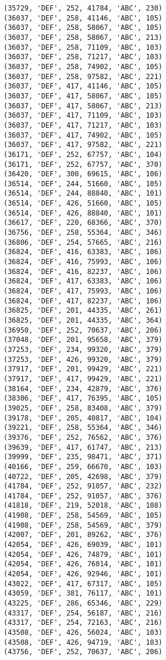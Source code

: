 \begin{verbatim}
(35729, 'DEF', 252, 41784, 'ABC', 230)
(36037, 'DEF', 258, 41146, 'ABC', 105)
(36037, 'DEF', 258, 58067, 'ABC', 105)
(36037, 'DEF', 258, 58067, 'ABC', 213)
(36037, 'DEF', 258, 71109, 'ABC', 103)
(36037, 'DEF', 258, 71217, 'ABC', 103)
(36037, 'DEF', 258, 74902, 'ABC', 105)
(36037, 'DEF', 258, 97582, 'ABC', 221)
(36037, 'DEF', 417, 41146, 'ABC', 105)
(36037, 'DEF', 417, 58067, 'ABC', 105)
(36037, 'DEF', 417, 58067, 'ABC', 213)
(36037, 'DEF', 417, 71109, 'ABC', 103)
(36037, 'DEF', 417, 71217, 'ABC', 103)
(36037, 'DEF', 417, 74902, 'ABC', 105)
(36037, 'DEF', 417, 97582, 'ABC', 221)
(36171, 'DEF', 252, 67757, 'ABC', 104)
(36171, 'DEF', 252, 67757, 'ABC', 370)
(36420, 'DEF', 300, 69615, 'ABC', 106)
(36514, 'DEF', 244, 51660, 'ABC', 105)
(36514, 'DEF', 244, 88840, 'ABC', 101)
(36514, 'DEF', 426, 51660, 'ABC', 105)
(36514, 'DEF', 426, 88840, 'ABC', 101)
(36617, 'DEF', 220, 68366, 'ABC', 370)
(36756, 'DEF', 258, 55364, 'ABC', 346)
(36806, 'DEF', 254, 57665, 'ABC', 216)
(36824, 'DEF', 416, 63383, 'ABC', 106)
(36824, 'DEF', 416, 75993, 'ABC', 106)
(36824, 'DEF', 416, 82237, 'ABC', 106)
(36824, 'DEF', 417, 63383, 'ABC', 106)
(36824, 'DEF', 417, 75993, 'ABC', 106)
(36824, 'DEF', 417, 82237, 'ABC', 106)
(36825, 'DEF', 201, 44335, 'ABC', 261)
(36825, 'DEF', 201, 44335, 'ABC', 364)
(36950, 'DEF', 252, 70637, 'ABC', 206)
(37048, 'DEF', 201, 95658, 'ABC', 379)
(37253, 'DEF', 234, 99320, 'ABC', 379)
(37253, 'DEF', 426, 99320, 'ABC', 379)
(37917, 'DEF', 201, 99429, 'ABC', 221)
(37917, 'DEF', 417, 99429, 'ABC', 221)
(38164, 'DEF', 234, 42879, 'ABC', 376)
(38306, 'DEF', 417, 76395, 'ABC', 105)
(39025, 'DEF', 258, 83408, 'ABC', 379)
(39178, 'DEF', 205, 40817, 'ABC', 104)
(39221, 'DEF', 258, 55364, 'ABC', 346)
(39376, 'DEF', 252, 76562, 'ABC', 376)
(39639, 'DEF', 417, 61747, 'ABC', 213)
(39999, 'DEF', 235, 98471, 'ABC', 371)
(40166, 'DEF', 259, 66670, 'ABC', 103)
(40722, 'DEF', 205, 42698, 'ABC', 379)
(41784, 'DEF', 252, 91057, 'ABC', 232)
(41784, 'DEF', 252, 91057, 'ABC', 376)
(41818, 'DEF', 219, 52018, 'ABC', 108)
(41908, 'DEF', 258, 54569, 'ABC', 105)
(41908, 'DEF', 258, 54569, 'ABC', 379)
(42007, 'DEF', 201, 89262, 'ABC', 376)
(42054, 'DEF', 426, 69039, 'ABC', 101)
(42054, 'DEF', 426, 74879, 'ABC', 101)
(42054, 'DEF', 426, 76014, 'ABC', 101)
(42054, 'DEF', 426, 92946, 'ABC', 101)
(43022, 'DEF', 417, 67317, 'ABC', 105)
(43059, 'DEF', 381, 76117, 'ABC', 101)
(43225, 'DEF', 286, 65346, 'ABC', 229)
(43317, 'DEF', 254, 56187, 'ABC', 216)
(43317, 'DEF', 254, 72163, 'ABC', 216)
(43508, 'DEF', 426, 56024, 'ABC', 103)
(43508, 'DEF', 426, 94719, 'ABC', 103)
(43756, 'DEF', 252, 70637, 'ABC', 206)

\end{verbatim}
